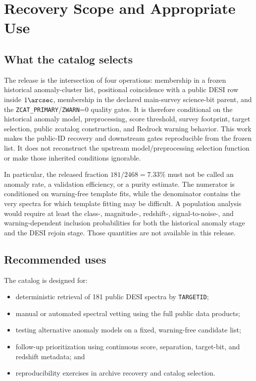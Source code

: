 \documentclass[twocolumn,linenumbers]{aastex702}
\begin{document}
\section{Recovery Scope and Appropriate Use}\label{sec:selection}

\subsection{What the catalog selects}\label{sec:what-selects}

The release is the intersection of four operations: membership in a frozen historical
anomaly-cluster list, positional coincidence with a public DESI row inside $1\arcsec$, membership
in the declared main-survey science-bit parent, and the
\texttt{ZCAT\_PRIMARY}/\texttt{ZWARN}=0 quality gates.  It is therefore conditional on the
historical anomaly model, preprocessing, score threshold, survey footprint, target selection,
public zcatalog construction, and Redrock warning behavior.  This work makes the public-ID
recovery and downstream gates reproducible from the frozen list.  It does not reconstruct the
upstream model/preprocessing selection function or make those inherited conditions ignorable.

In particular, the released fraction $181/2468=7.33\%$ must not be called an anomaly rate, a
validation efficiency, or a purity estimate.  The numerator is conditioned on warning-free
template fits, while the denominator contains the very spectra for which template fitting may be
difficult.  A population analysis would require at least the class-, magnitude-, redshift-,
signal-to-noise-, and warning-dependent inclusion probabilities for both the historical anomaly
stage and the DESI rejoin stage.  Those quantities are not available in this release.

\subsection{Recommended uses}\label{sec:uses}

The catalog is designed for:
\begin{itemize}
\item deterministic retrieval of 181 public DESI spectra by \texttt{TARGETID};
\item manual or automated spectral vetting using the full public data products;
\item testing alternative anomaly models on a fixed, warning-free candidate list;
\item follow-up prioritization using continuous score, separation, target-bit, and redshift metadata; and
\item reproducibility exercises in archive recovery and catalog selection.
\end{itemize}
\end{document}
